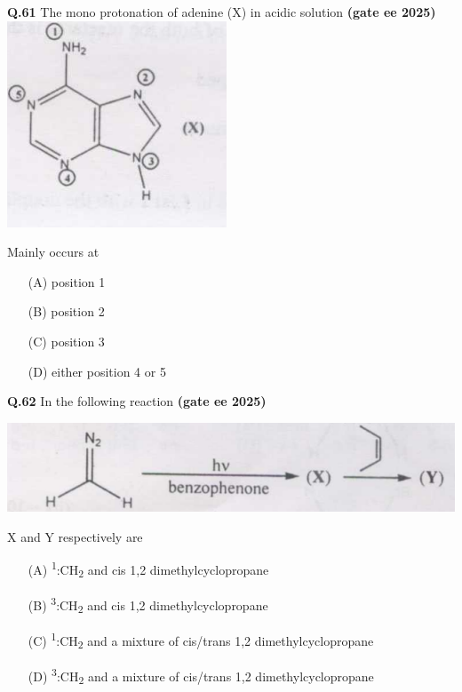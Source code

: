 \documentclass[journal,12pt,onecolumn]{exam}
\theoremstyle{remark}
\begin{document}
\vspace{0.5cm}

\noindent\textbf{Q.61} The mono protonation of adenine (X) in acidic solution \hfill{\textbf{(gate ee 2025)}}
\includegraphics[scale=1.5 ]{images/image5.png}


Mainly occurs at \hfill{  }

\begin{multicols}{2}
\begin{itemize}
    \item[(A)] position 1
    \item[(B)] position 2
    \item[(C)] position 3
    \item[(D)] either position 4 or 5
\end{itemize}
\end{multicols}

\vspace{0.5cm}

\noindent\textbf{Q.62} In the following reaction \hfill{\textbf{(gate ee 2025)}}

\includegraphics[scale=1.5 ]{images/image6.png}

X and Y respectively are

\begin{multicols}{2}
\begin{itemize}
    \item[(A)] \textsuperscript{1}:CH\textsubscript{2} and cis 1,2 dimethylcyclopropane
    \item[(B)] \textsuperscript{3}:CH\textsubscript{2} and cis 1,2 dimethylcyclopropane
    \item[(C)] \textsuperscript{1}:CH\textsubscript{2} and a mixture of cis/trans 1,2 dimethylcyclopropane
    \item[(D)] \textsuperscript{3}:CH\textsubscript{2} and a mixture of cis/trans 1,2 dimethylcyclopropane
\end{itemize}
\end{multicols}
\end{document}
